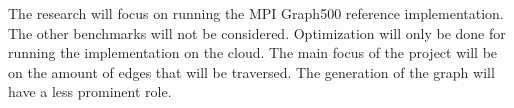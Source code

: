 The research will focus on running the MPI Graph500 reference implementation. The other benchmarks will not be considered. Optimization will only be done for running the implementation on the cloud.
The main focus of the project will be on the amount of edges that will be traversed. The generation of the graph will have a less prominent role.